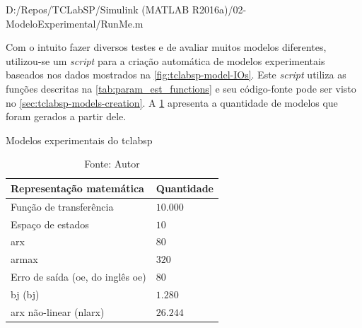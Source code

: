 
	{D:/Repos/TCLabSP/Simulink (MATLAB R2016a)/02-ModeloExperimental/RunMe.m}
	\begin{center}
    \end{center}

Com o intuito fazer diversos testes e de avaliar muitos modelos diferentes, utilizou-se um
\textit{script} para a criação automática de modelos experimentais baseados nos dados mostrados
na \cref{fig:tclabsp-model-IOs}. Este \textit{script} utiliza as funções descritas na \cref{tab:param_est_functions}
e seu código-fonte pode ser visto no \cref{sec:tclabsp-models-creation}. 
A \cref{tab:tclabsp-models-description} apresenta a quantidade de modelos que foram gerados a partir dele.

\begin{table}[h]
	\centering
	\caption{Modelos experimentais do \acrshort{tclabsp}}
	\label{tab:tclabsp-models-description}
	\begin{tabular}{ll} \toprule
		{Representação matemática}		                                & {Quantidade}          \\ \midrule
		Função de transferência		                                    & $10.000$              \\
		Espaço de estados   		                                    & $10$                  \\
		\acrshort{arx}		                                            & $80$                  \\
		\acrshort{armax}		                                        & $320$                 \\
		Erro de saída (\acrshort{oe}, do inglês \acrlong{oe})		    & $80$                  \\
		\acrlong{bj} (\acrshort{bj})                                    & $1.280$               \\
		\acrshort{arx} não-linear (\acrshort{nlarx})                    & $26.244$              \\ \bottomrule
	\end{tabular}
	\caption*{Fonte: Autor}
\end{table}

